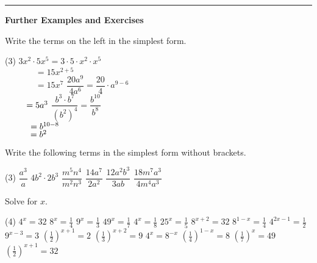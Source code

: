 \vspace*{2cm}
\hrule
\begin{center} \textbf{Further Examples and Exercises} \end{center}
\begin{example}
	Write the terms on the left in the simplest form.
	\begin{tasks}(3)
		\task $3x^2\cdot 5x^5=3\cdot 5\cdot x^2\cdot x^5$ \\
		$\phantom{3x^2\cdot 5x^5}=15x^{2+5}$ \\
		$\phantom{3x^2\cdot 5x^5}=15x^7$
		\task $\dfrac{20a^9}{4a^6}=\dfrac{20}{4}\cdot a^{9-6}$ \\
		$\smash{\phantom{\dfrac{20a^9}{4a^6}}}=5a^3$
		\task $\dfrac{b^3\cdot b^7}{\left(b^2\right)^4}=\dfrac{b^{10}}{b^8}$ \\
		$\smash{\phantom{\dfrac{b^3\cdot b^7}{\left(b^2\right)^4}}}=b^{10-8}$ \\
		$\smash{\phantom{\dfrac{b^3\cdot b^7}{\left(b^2\right)^4}}}=b^2$ 
	\end{tasks}
\end{example}
\begin{exercise}
	Write the following terms in the simplest form without brackets.
	\begin{tasks}(3)
		\task $\dfrac{a^3}{a}$
		\task $4b^2\cdot 2b^3$
		\task $\dfrac{m^5n^4}{m^2n^3}$
		\task $\dfrac{14a^7}{2a^2}$
		\task $\dfrac{12a^2b^3}{3ab}$
		\task $\dfrac{18m^7a^3}{4m^4a^3}$
	\end{tasks}
\end{exercise}
\begin{exercise}
	Solve for $x$.
	\begin{tasks}(4)
		\task $4^x=32$ \task $8^x=\frac{1}{4}$ \task $9^x=\frac{1}{3}$ \task $49^x=\frac{1}{7}$
		\task $4^x=\frac{1}{8}$ \task $25^x=\frac{1}{5}$ \task $8^{x+2}=32$
		\task $8^{1-x}=\frac{1}{4}$
		\task $4^{2x-1}=\frac{1}{2}$ \task $9^{x-3}=3$ \task $\left(\frac{1}{2}\right)^{x+1}=2$
		\task $\left(\frac{1}{3}\right)^{x+2}=9$
		\task $4^x=8^{-x}$ \task $\left(\frac{1}{4}\right)^{1-x}=8$
		\task $\left(\frac{1}{7}\right)^x=49$ \task $\left(\frac{1}{2}\right)^{x+1}=32$ 
	\end{tasks}
\end{exercise}
